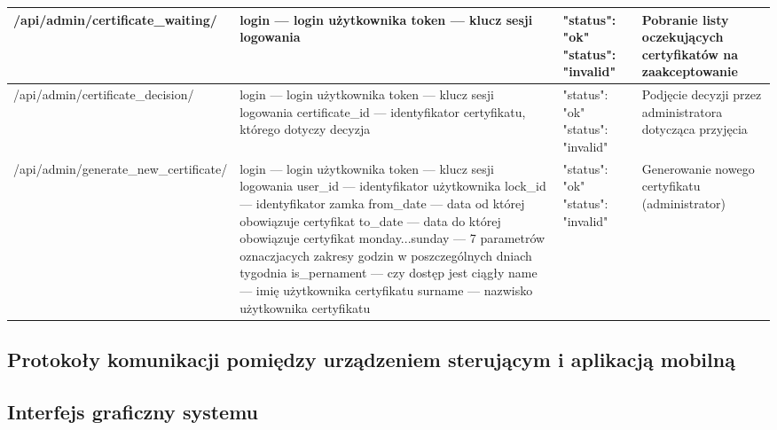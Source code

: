\begin{landscape}
\begin{longtable}[!ht]{|m{5cm}|m{6cm}|m{6.5cm}|m{3cm}|}
		/api/admin/certificate\_waiting/ & login --- login użytkownika \newline token --- klucz sesji logowania & "status": "ok" \tablinia "status": "invalid" & Pobranie listy oczekujących certyfikatów na zaakceptowanie \\ \hline
		/api/admin/certificate\_decision/ & login --- login użytkownika \newline token --- klucz sesji logowania \newline certificate\_id --- identyfikator certyfikatu, którego dotyczy decyzja & "status": "ok" \tablinia "status": "invalid" & Podjęcie decyzji przez administratora dotycząca przyjęcia \\ \hline
		/api/admin/\linebreak generate\_new\_certificate/ & login --- login użytkownika \newline token --- klucz sesji logowania \newline user\_id --- identyfikator użytkownika \newline lock\_id --- identyfikator zamka \newline from\_date --- data od której obowiązuje certyfikat \newline to\_date --- data do której obowiązuje certyfikat \newline monday...sunday --- 7 parametrów oznaczjacych zakresy godzin w poszczególnych dniach tygodnia \newline is\_pernament --- czy dostęp jest ciągły \newline name --- imię użytkownika certyfikatu \newline surname --- nazwisko użytkownika certyfikatu & "status": "ok" \tablinia "status": "invalid" & Generowanie nowego certyfikatu (administrator) \\ \hline
		
	\end{longtable}
\end{landscape}
	
\newpage
\subsection{Protokoły komunikacji pomiędzy urządzeniem \newline sterującym i aplikacją mobilną}

\newpage
\subsection{Interfejs graficzny systemu}\label{sec:Projekt interfejsu graficznego}
